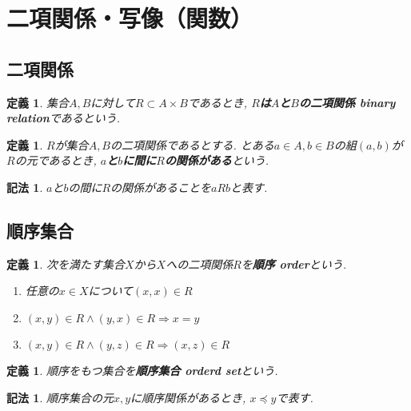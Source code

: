 \documentclass[dvipdfmx]{jsbook}
\theoremstyle{plain}
\newtheorem{Def}[thm]{定義}
\newtheorem{Notation}[thm]{記法}
\begin{document}
\section{二項関係・写像（関数）}
\subsection{二項関係}
\begin{Def}
集合$A,B$に対して$R\subset A\times B$であるとき, {\bf $R$は$A$と$B$の二項関係 binary relation}であるという.
\end{Def}
\begin{Def}
$R$が集合$A,B$の二項関係であるとする. 
とある$a\in A, b\in B$の組$(a,b)$が$R$の元であるとき,
{\bf $a$と$b$に間に$R$の関係がある}という.
\end{Def}
\begin{Notation}
$a$と$b$の間に$R$の関係があることを$aRb$と表す.
\end{Notation}
\subsection{順序集合}
\begin{Def}
次を満たす集合$X$から$X$への二項関係$R$を{\bf 順序 order}という.
\begin{enumerate}
\item 任意の$x\in X$について$(x,x)\in R$
\item $(x,y)\in R\land(y,x)\in R\Rightarrow x=y$
\item $(x,y)\in R\land (y,z)\in R
\Rightarrow (x,z)\in R$
\end{enumerate}
\end{Def}
\begin{Def}
順序をもつ集合を{\bf 順序集合 orderd set}という.
\end{Def}
\begin{Notation}
順序集合の元$x,y$に順序関係があるとき, $x\preceq y$で表す.
\end{Notation}
\end{document}

